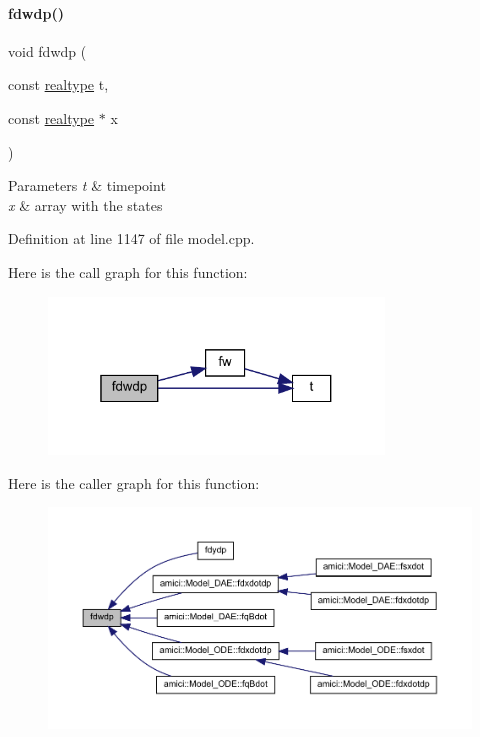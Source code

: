 \paragraph{\texorpdfstring{fdwdp()}{fdwdp()}\hspace{0.1cm}{\footnotesize\ttfamily [1/2]}}
{\footnotesize\ttfamily void fdwdp (\begin{DoxyParamCaption}\item[{const \mbox{\hyperlink{namespaceamici_a1bdce28051d6a53868f7ccbf5f2c14a3}{realtype}}}]{t,  }\item[{const \mbox{\hyperlink{namespaceamici_a1bdce28051d6a53868f7ccbf5f2c14a3}{realtype}} $\ast$}]{x }\end{DoxyParamCaption})}


\begin{DoxyParams}{Parameters}
{\em t} & timepoint \\
\hline
{\em x} & array with the states \\
\hline
\end{DoxyParams}


Definition at line 1147 of file model.\+cpp.

Here is the call graph for this function\+:
\nopagebreak
\begin{figure}[H]
\begin{center}
\leavevmode
\includegraphics[width=253pt]{classamici_1_1_model_a7a8903313cd31dad4fa580c0e434bb1c_cgraph}
\end{center}
\end{figure}
Here is the caller graph for this function\+:
\nopagebreak
\begin{figure}[H]
\begin{center}
\leavevmode
\includegraphics[width=350pt]{classamici_1_1_model_a7a8903313cd31dad4fa580c0e434bb1c_icgraph}
\end{center}
\end{figure}
\mbox{\label{classamici_1_1_model_a29b16aa0c3fb0254fb248c003473d5f9}} 
